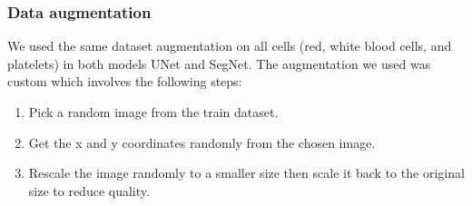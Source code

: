 \documentclass[conference]{IEEEtran}
\begin{document}
\subsubsection{Data augmentation}
We used the same dataset augmentation on all cells (red, white blood cells, and platelets) in both models UNet and SegNet. The augmentation we used was custom which involves the following steps:
\begin{enumerate}
\item Pick a random image from the train dataset.
\item Get the x and y coordinates randomly from the chosen image.
\item Rescale the image randomly to a smaller size then scale it back to the original size to reduce quality.
\end{enumerate}
\end{document}
